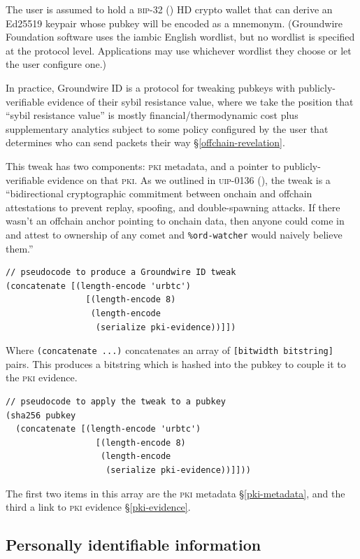 \documentclass[twoside]{article}
\begin{document}
The user is assumed to hold a \textsc{bip}-32 (\citeyear{BIP0032}) HD crypto wallet
that can derive an Ed25519 keypair whose pubkey will be encoded as a
mnemonym. (Groundwire Foundation software uses the iambic English
wordlist, but no wordlist is specified at the protocol level.
Applications may use whichever wordlist they choose or let the user
configure one.)

In practice, Groundwire ID is a protocol for tweaking pubkeys with
publicly-verifiable evidence of their sybil resistance value, where we
take the position that ``sybil resistance value'' is mostly
financial/thermodynamic cost plus supplementary analytics
subject to some policy configured by the user that determines who can send
packets their way \S\ref{offchain-revelation}.

This tweak has two components: \textsc{pki} metadata, and a pointer to
publicly-verifiable evidence on that \textsc{pki}. As we outlined in
\textsc{uip}-0136 (\citeyear{UIP-0136}), the tweak is a
``bidirectional cryptographic commitment between onchain and offchain
attestations to prevent replay, spoofing, and double-spawning attacks. If
there wasn't an offchain anchor pointing to onchain data, then anyone
could come in and attest to ownership of any comet and \texttt{\%ord-watcher}
would naively believe them.''

\begin{lstlisting}[style=listingblock]
// pseudocode to produce a Groundwire ID tweak
(concatenate [(length-encode 'urbtc')
                [(length-encode 8)
                 (length-encode
                  (serialize pki-evidence))]])
\end{lstlisting}

Where \texttt{(concatenate\ ...)} concatenates an array of
\texttt{{[}bitwidth\ bitstring{]}} pairs. This produces a
bitstring which is hashed into the pubkey to couple it to the \textsc{pki} evidence.

\begin{lstlisting}[style=listingblock]
// pseudocode to apply the tweak to a pubkey
(sha256 pubkey
  (concatenate [(length-encode 'urbtc')
                  [(length-encode 8)
                   (length-encode
                    (serialize pki-evidence))]]))
\end{lstlisting}

The first two items in this array are the \textsc{pki} metadata \S\ref{pki-metadata}, and the
third a link to \textsc{pki} evidence \S\ref{pki-evidence}.

\subsection{Personally identifiable
information}\label{personally-identifiable-information}
\end{document}
